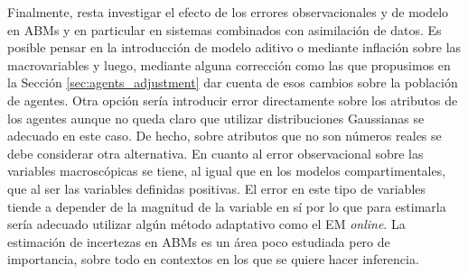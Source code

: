 Finalmente, resta investigar el efecto de los errores observacionales y de modelo en ABMs y en particular en sistemas combinados con asimilación de datos. Es posible pensar en la introducción de modelo aditivo o mediante inflación sobre las macrovariables y luego, mediante alguna corrección como las que propusimos en la Sección \ref{sec:agents_adjustment} dar cuenta de esos cambios sobre la población de agentes. Otra opción sería introducir error directamente sobre los atributos de los agentes aunque no queda claro que utilizar distribuciones Gaussianas se adecuado en este caso. De hecho, sobre  atributos que no son números reales se debe considerar otra alternativa. En cuanto al error observacional sobre las variables macroscópicas se tiene, al igual que en los modelos compartimentales, que al ser las variables definidas positivas. El error en este tipo de variables tiende a depender de la magnitud de la variable en sí por lo que para estimarla sería adecuado utilizar algún método adaptativo como el EM \textit{online}. La estimación de incertezas en ABMs es un área poco estudiada pero de importancia, sobre todo en contextos en los que se quiere hacer inferencia. 

